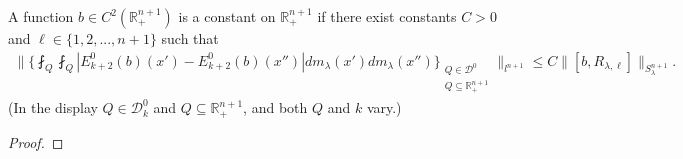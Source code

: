 \documentclass[12pt]{amsart}
\begin{document}
\begin{lemma}\label{aux}
A function {\color{red}$b \in C^2(\mathbb{R}_+^{n+1})$} is a constant on $\mathbb{R}_+^{n+1}$ if there exist constants $C>0$ and $\ell\in\{1,2,...,n+1\}$ such that
\begin{align}\label{eqsup1}
\bigg\|\bigg\{\fint_{Q}\fint_{Q}|E_{k+2}^0(b)(x') - E_{k+2}^0(b)(x'')|dm_\lambda(x')dm_\lambda(x'')\bigg\}_{\substack{Q\in \mathcal{D}^0\\Q\subseteq \mathbb{R}_+^{n+1}}}\bigg\|_{l^{n+1}} \leq C\|[b,R_{\lambda,\ell}]\|_{S_\lambda^{n+1}}.
\end{align}
(In the display $Q\in \mathcal{D}_{k}^0$ and $Q\subseteq \mathbb{R}_+^{n+1}$, and both $Q$ and $k$ vary.)
\end{lemma}

\begin{proof}


\end{proof}
\end{document}
